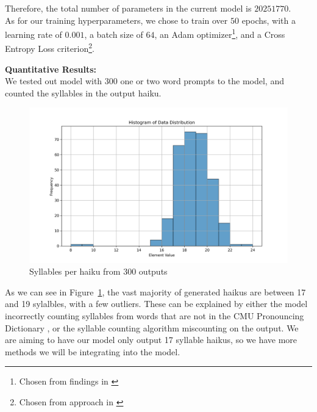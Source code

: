 \documentclass{article} %
\begin{document}
Therefore, the total number of parameters in the current model is $20251770$. \\

As for our training hyperparameters, we chose to train over $50$ epochs, with a learning rate of $0.001$, a batch size of $64$, an Adam optimizer\footnote{Chosen from findings in \citep{kingma2017adammethodstochasticoptimization}}, and a Cross Entropy Loss criterion\footnote{Chosen from approach in \citep{tensorflow_text_generation}}.

\textbf{Quantitative Results:} \\
We tested out model with 300 one or two word prompts to the model, and counted the syllables in the output haiku.

\begin{figure}[h]
\begin{center}
\includegraphics[width=1\textwidth]{Figs/plot.png}
\end{center}
\caption{Syllables per haiku from 300 outputs}
\label{fig:plot}
\end{figure}

As we can see in Figure~\ref{fig:plot}, the vast majority of generated haikus are between 17 and 19 sylalbles, with a few outliers. 
These can be explained by either the model incorrectly counting syllables from words that are not
in the CMU Pronouncing Dictionary \citep{cmu_pronouncing_dictionary}, or the syllable counting algorithm
miscounting on the output.
We are aiming to have our model only output 17 syllable haikus, so we have more methods we will be integrating into the model.
\end{document}
